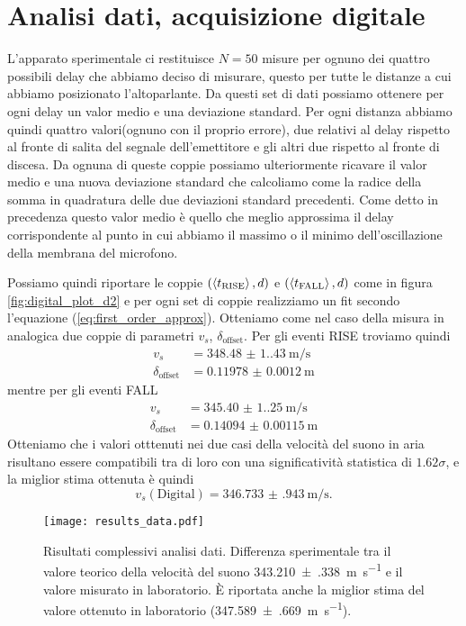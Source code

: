 \documentclass[
    rmp,
    reprint, 
    superscriptaddress, 
    altaffilletter, 
    amsmath, 
    amssymb, 
    a4paper,
    varvw]{revtex4-2}
\begin{document}
\section{Analisi dati, acquisizione digitale}

L'apparato sperimentale ci restituisce $N=50$ misure per ognuno dei quattro possibili delay che abbiamo deciso di misurare, questo per tutte le distanze a cui abbiamo posizionato l'altoparlante. Da questi set di dati possiamo ottenere per ogni delay un valor medio e una deviazione standard. Per ogni distanza abbiamo quindi quattro valori(ognuno con il proprio errore), due relativi al delay rispetto al fronte di salita del segnale dell'emettitore e gli altri due rispetto al fronte di discesa. Da ognuna di queste coppie possiamo ulteriormente ricavare il valor medio e una nuova deviazione standard che calcoliamo come la radice della somma in quadratura delle due deviazioni standard precedenti. Come detto in precedenza questo valor medio è quello che meglio approssima il delay corrispondente al punto in cui abbiamo il massimo o il minimo dell'oscillazione della membrana del microfono. 

Possiamo quindi riportare le coppie $(\expval{t_\text{RISE}}, d)$ e $(\expval{t_\text{FALL}}, d)$ come in figura \ref{fig:digital_plot_d2} e per ogni set di coppie realizziamo un fit secondo l'equazione (\ref{eq:first_order_approx}). Otteniamo come nel caso della misura in analogica due coppie di parametri $v_s$, $\delta_\text{offset}$.
Per gli eventi RISE troviamo quindi
\begin{align*}
    v_s &= \SI{348.48(1.43)}{\metre\per\second} \\
    \delta_\text{offset} &= \SI{0.11978(120)}{\metre}
\end{align*}
mentre per gli eventi FALL
\begin{align*}
    v_s &= \SI{345.40(1.25)}{\metre\per\second} \\
    \delta_\text{offset} &= \SI{0.14094(115)}{\metre}
\end{align*}
Otteniamo che i valori otttenuti nei due casi della velocità del suono in aria risultano essere compatibili tra di loro con una significatività statistica di $1.62\sigma$, e la miglior stima ottenuta è quindi \[v_s(\text{Digital}) = \SI{346.733(943)}{\metre\per\second}.\]


\begin{figure}
    \centering
    \texttt{[image: results\_data.pdf]}
    \caption{Risultati complessivi analisi dati. Differenza sperimentale tra il valore teorico della velocità del suono \SI{343.210(338)}{\metre\per\second} e il valore misurato in laboratorio. \`E riportata anche la miglior stima del valore ottenuto in laboratorio (\SI{347.589(669)}{\metre\per\second}).}\label{fig:results}
\end{figure}
\end{document}
